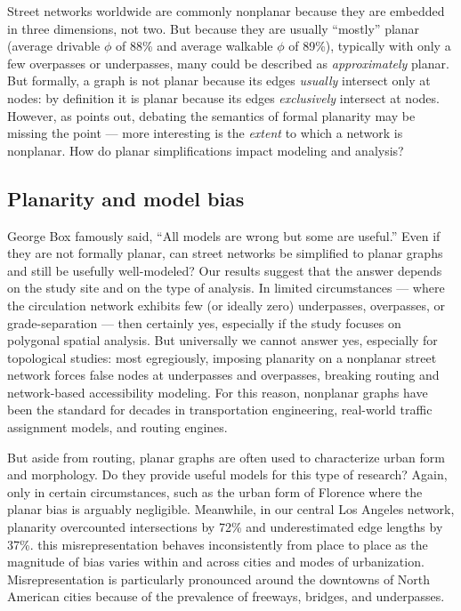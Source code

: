 \documentclass[Afour,sageh,times]{sagej}
\begin{document}
Street networks worldwide are commonly nonplanar because they are embedded in three dimensions, not two. But because they are usually \enquote{mostly} planar (average drivable $\phi$ of 88\% and average walkable $\phi$ of 89\%), typically with only a few overpasses or underpasses, many could be described as \emph{approximately} planar. But formally, a graph is not planar because its edges \emph{usually} intersect only at nodes: by definition it is planar because its edges \emph{exclusively} intersect at nodes. However, as \citet{newman_networks:_2010} points out, debating the semantics of formal planarity may be missing the point --- more interesting is the \emph{extent} to which a network is nonplanar. How do planar simplifications impact modeling and analysis?

\subsection{Planarity and model bias}

George Box famously said, \enquote{All models are wrong but some are useful.} Even if they are not formally planar, can street networks be simplified to planar graphs and still be usefully well-modeled? Our results suggest that the answer depends on the study site and on the type of analysis. In limited circumstances --- where the circulation network exhibits few (or ideally zero) underpasses, overpasses, or grade-separation --- then certainly yes, especially if the study focuses on polygonal spatial analysis. But universally we cannot answer yes, especially for topological studies: most egregiously, imposing planarity on a nonplanar street network forces false nodes at underpasses and overpasses, breaking routing and network-based accessibility modeling. For this reason, nonplanar graphs have been the standard for decades in transportation engineering, real-world traffic assignment models, and routing engines.

But aside from routing, planar graphs are often used to characterize urban form and morphology. Do they provide useful models for this type of research? Again, only in certain circumstances, such as the urban form of Florence where the planar bias is arguably negligible. Meanwhile, in our central Los Angeles network, planarity overcounted intersections by 72\% and underestimated edge lengths by 37\%. this misrepresentation behaves inconsistently from place to place as the magnitude of bias varies within and across cities and modes of urbanization. Misrepresentation is particularly pronounced around the downtowns of North American cities because of the prevalence of freeways, bridges, and underpasses.
\end{document}
